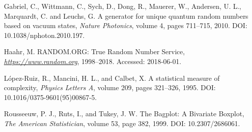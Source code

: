 \documentclass[a4,11pt]{pssbmac}
\begin{document}
\begin{thebibliography}{00}
		 Gabriel, C., Wittmann, C., Sych, D., Dong, R., Mauerer, W., Andersen, U. L., Marquardt, C. and Leuchs, G.
		A generator for unique quantum random numbers based on vacuum states,
		{\it Nature Photonics}, 
		volume 4, 
		pages 711--715,
		2010. 
		DOI: 10.1038/nphoton.2010.197.
		
		 Haahr, M.
		RANDOM.ORG: True Random Number Service,
		{\it \url{https://www.random.org}}, 
		1998--2018. 
		Accessed: 2018-06-01.
		
		 L\'opez-Ruiz, R., Mancini, H. L., and Calbet, X.
		A statistical measure of complexity, 
		{\it Physics Letters A}, 
		volume 209, 
		pages 321--326,
		1995. 
		DOI: 10.1016/0375-9601(95)00867-5.
		
		 Rousseeuw, P. J., Ruts, I., and Tukey, J. W.
		The Bagplot: A Bivariate Boxplot,
		{\it The American Statistician}, 
		volume 53, 
		page 382,
		1999. 
		DOI: 10.2307/2686061.
		
	\end{thebibliography}
	
\end{document}
